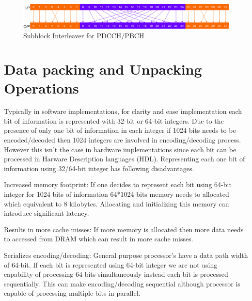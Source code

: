 \begin{figure}[h]
	\centering
	\includegraphics[width=1\textwidth]{./figures/subblockInterleaver.pdf}
	\caption{Subblock Interleaver for PDCCH/PBCH}
	\label{fig:subblockInterleaver}
\end{figure}

\section{Data packing and Unpacking Operations} \label{dataPackUnpack}
Typically in software implementations, for clarity and ease implementation each bit of information is represented with 32-bit or 64-bit integers. Due to the presence of only one bit of information in each integer if 1024 bits needs to be encoded/decoded then 1024 integers are involved in encoding/decoding process. However this isn't the case in hardware implementations since each bit can be processed in Harware Description languages (HDL). Representing each one bit of information using 32/64-bit integer has following disadvantages.

\begin{description}[font=$\bullet$~\normalfont]
	\item Increased memory footprint: If one decides to represent each bit using 64-bit integer for 1024 bits of information 64*1024 bits memory needs to allocated which equivalent to 8 kilobytes. Allocating and initializing this memory can introduce significant latency.
	\item Results in more cache misses: If more memory is allocated then more data needs to accessed from DRAM which can result in more cache misses.
	\item Serializes encoding/decoding: General purpose processor's have a data path width of 64-bit. If each bit is represented using 64-bit integer we are not using capability of processing 64 bits simultaneously instead each bit is processed sequentially. This can make encoding/decoding sequential although processor is capable of processing multiple bits in parallel.
\end{description}

